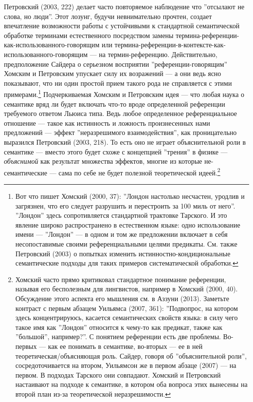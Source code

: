 \documentclass[11pt]{book}
\begin{document}
Петровский (2003, 222) делает часто повторяемое наблюдение что ''отсылают не слова, но люди''. Этот лозунг, будучи невнимательно прочтен, создает впечатление возможности работы с устойчивыми к стандартной семантической обработке терминами естественного посредством замены термина-референции-как-использованного-говорящим или термина-референции-в-контексте-как-использованного-говорящим --- на термин-референцию. Действительно, предположение Сайдера о серьезном восприятии ''референции-говорящим'' Хомским и Петровским упускает силу их возражений --- а они ведь ясно показывают, что ни один простой прием такого рода не справляется с этими примерами.\footnote{Вот что пишет Хомский (2000, 37): ''Лондон настолько несчастен, уродлив и загрязнен, что его следует разрушить и перестроить за 100 миль от него''. ''Лондон'' здесь сопротивляется стандартной трактовке Тарского. И это явление широко распространено в естественном языке: одно использование имени --- ''Лондон'' --- в одном и том же предложении включает в себя несопоставимые своими референциальными целями предикаты. См. также Петровский (2003) о попытках изменить истинностно-кондициональные семантические подходы для таких примеров систематической обработки.} Подчеркиваемая Хомским и Петровским идея --- что любая наука о семантике вряд ли будет включать что-то вроде определенной референции требуемого ответом Льюиса типа. Ведь любое определенное референциальное отношение --- такое как истинность и ложность произнесенных нами предложений --- эффект ''неразрешимого взаимодействия'', как проницательно выразился Петровский (2003, 218). То есть оно не играет объяснительной роли в семантике --- вместо этого будет схоже с концепцией ''трения'' в физике --- \textit{объяснимой} как результат множества эффектов, многие из которые не-семантические --- сама по себе не будет полезной теоретической идеей.\footnote{Хомский часто прямо критиковал стандартное понимание референции, называя его бесполезным для лингвистов, например в Хомский (2000, 40). Обсуждение этого аспекта его мышления см. в Аззуни (2013). Заметьте контраст с первым абзацем Уильямса (2007, 361): ''Подвопрос, на котором здесь концентрируюсь, касается семантических свойств языка: в силу чего такое имя как ''Лондон'' относится к чему-то как предикат, также как ''большой'', например?''. С понятием референции есть две проблемы. Во-первых --- как ее понимать в семантике, во-вторых --- ее в ней теоретическая/объясняющая роль. Сайдер, говоря об ''объяснительной роли'', сосредоточивается на втором, Уильямсон же в первом абзаце (2007) --- на первом. В подходах Тарского они совпадают. Хомский и Петровский настаивают на подходе к семантике, в котором оба вопроса этих вынесены на второй план из-за теоретической неразрешимости.}
\end{document}
